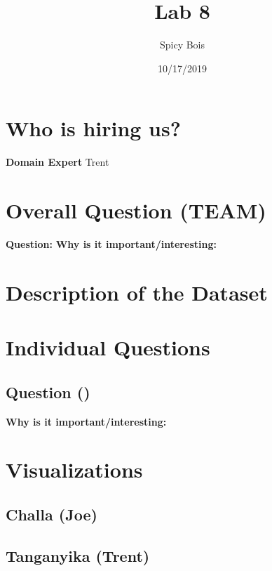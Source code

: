 \documentclass[]{article}
\title{Lab 8}
\author{Spicy Bois}
\date{10/17/2019}
\begin{document}
\maketitle

\hypertarget{who-is-hiring-us}{%
\section{Who is hiring us?}\label{who-is-hiring-us}}

\textbf{Domain Expert} Trent

\hypertarget{overall-question-team}{%
\section{Overall Question (TEAM)}\label{overall-question-team}}

\textbf{Question:} \textbf{Why is it important/interesting:}

\hypertarget{description-of-the-dataset}{%
\section{Description of the Dataset}\label{description-of-the-dataset}}

\hypertarget{individual-questions}{%
\section{Individual Questions}\label{individual-questions}}

\hypertarget{question}{%
\subsection{Question ()}\label{question}}

\textbf{Why is it important/interesting:}

\hypertarget{visualizations}{%
\section{Visualizations}\label{visualizations}}

\hypertarget{challa-joe}{%
\subsection{Challa (Joe)}\label{challa-joe}}

\hypertarget{tanganyika-trent}{%
\subsection{Tanganyika (Trent)}\label{tanganyika-trent}}
\end{document}
